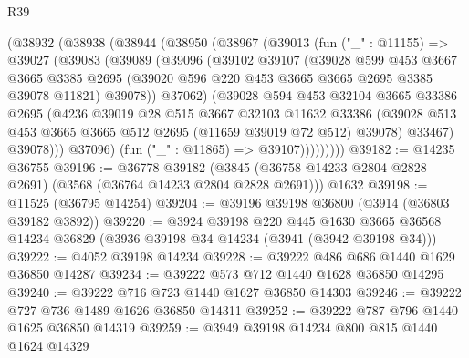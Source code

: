 \begin{lexlean}{R39}
\begin{coremodule}
        (@38932
          (@38938
            (@38944
              (@38950
                (@38967
                  (@39013
                    (fun ("_" : @11155) =>
                    @39027
                      (@39083
                        (@39089
                          (@39096
                            (@39102
                              @39107
                              (@39028
                                @599
                                @453
                                @3667
                                @3665
                                @3385
                                @2695
                                (@39020 @596 @220 @453 @3665 @3665 @2695 @3385 @39078 @11821)
                                @39078))
                            @37062)
                          (@39028
                            @594
                            @453
                            @32104
                            @3665
                            @33386
                            @2695
                            (@4236
                              @39019
                              @28
                              @515
                              @3667
                              @32103
                              @11632
                              @33386
                              (@39028
                                @513
                                @453
                                @3665
                                @3665
                                @512
                                @2695
                                (@11659 @39019 @72 @512)
                                @39078)
                              @33467)
                            @39078)))
                      @37096)
                    (fun ("_" : @11865) => @39107)))))))))
@39182 := @14235 @36755
@39196 := @36778
    @39182
    (@3845 (@36758 @14233 @2804 @2828 @2691) (@3568 (@36764 @14233 @2804 @2828 @2691)))
    @1632
@39198 := @11525 (@36795 @14254)
@39204 := @39196 @39198 @36800 (@3914 (@36803 @39182 @3892))
@39220 := @3924
    @39198
    @220
    @445
    @1630
    @3665
    @36568
    @14234
    @36829
    (@3936 @39198 @34 @14234 (@3941 (@3942 @39198 @34)))
@39222 := @4052 @39198 @14234
@39228 := @39222 @486 @686 @1440 @1629 @36850 @14287
@39234 := @39222 @573 @712 @1440 @1628 @36850 @14295
@39240 := @39222 @716 @723 @1440 @1627 @36850 @14303
@39246 := @39222 @727 @736 @1489 @1626 @36850 @14311
@39252 := @39222 @787 @796 @1440 @1625 @36850 @14319
@39259 := @3949 @39198 @14234 @800 @815 @1440 @1624 @14329

\end{coremodule}
\end{lexlean}
